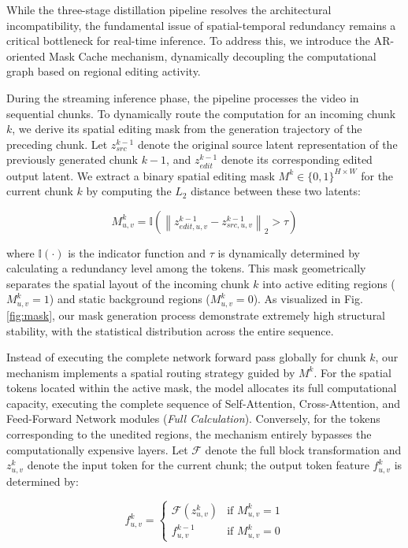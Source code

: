 \documentclass{llmxive}
\begin{document}
While the three-stage distillation pipeline resolves the architectural incompatibility, the fundamental issue of spatial-temporal redundancy remains a critical bottleneck for real-time inference. To address this, we introduce the AR-oriented Mask Cache mechanism, dynamically decoupling the computational graph based on regional editing activity.

During the streaming inference phase, the pipeline processes the video in sequential chunks. To dynamically route the computation for an incoming chunk $k$, we derive its spatial editing mask from the generation trajectory of the preceding chunk. Let $z_{src}^{k-1}$ denote the original source latent representation of the previously generated chunk $k-1$, and $z_{edit}^{k-1}$ denote its corresponding edited output latent. We extract a binary spatial editing mask $M^k\in\{0,1\}^{H\times W}$ for the current chunk $k$ by computing the $L_2$ distance between these two latents:

$$M^k_{u,v}=\mathbb{I}\left(\left\|z_{edit,u,v}^{k-1}-z_{src,u,v}^{k-1}\right\|_2>\tau\right)$$

where $\mathbb{I}(\cdot)$ is the indicator function and $\tau$ is dynamically determined by calculating a redundancy level among the tokens. This mask geometrically separates the spatial layout of the incoming chunk $k$ into active editing regions ($M^k_{u,v}=1$) and static background regions ($M^k_{u,v}=0$). As visualized in Fig. \ref{fig:mask}, our mask generation process demonstrate extremely high structural stability, with the statistical distribution across the entire sequence.

Instead of executing the complete network forward pass globally for chunk $k$, our mechanism implements a spatial routing strategy guided by $M^k$. For the spatial tokens located within the active mask, the model allocates its full computational capacity, executing the complete sequence of Self-Attention, Cross-Attention, and Feed-Forward Network modules (\textit{Full Calculation}). Conversely, for the tokens corresponding to the unedited regions, the mechanism entirely bypasses the computationally expensive layers. Let $\mathcal{F}$ denote the full block transformation and $z^k_{u,v}$ denote the input token for the current chunk; the output token feature $f^k_{u,v}$ is determined by:

$$f^k_{u,v}=\begin{cases}\mathcal{F}(z^k_{u,v})&\text{if }M^k_{u,v}=1\\f^{k-1}_{u,v}&\text{if }M^k_{u,v}=0\end{cases}$$
\end{document}
